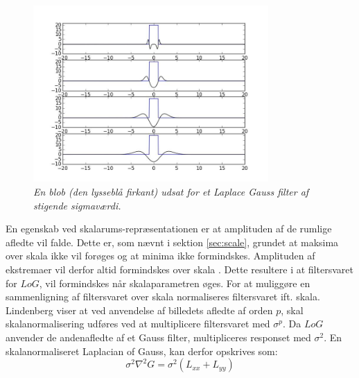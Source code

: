 \begin{figure}[H]
    \centering
    \includegraphics[width=0.80\textwidth]{fig/42.jpg}
    \vspace{-0.75em}
    \begin{center}
    \caption{{\footnotesize \textit{En blob (den lysseblå firkant) udsat for et Laplace Gauss filter af stigende sigmaværdi.
}}}
    \label{fig:laprespons}
     \end{center}
  \end{figure}
       \vspace{-2.7em}
\noindent
En egenskab ved skalarums-repræsentationen er at amplituden af de rumlige afledte vil falde. Dette er, som nævnt i sektion \ref{sec:scale}, grundet at maksima over skala ikke vil forøges og at minima ikke formindskes. Amplituden af ekstremaer vil derfor altid formindskes over skala \cite{phdlind}. Dette resultere i at filtersvaret for $LoG$, vil formindskes når skalaparametren øges. For at muliggøre en sammenligning af filtersvaret over skala normaliseres filtersvaret ift. skala.  Lindenberg \cite{lindenscale} viser at ved anvendelse af billedets afledte af orden $p$, skal skalanormalisering udføres ved at multiplicere filtersvaret med $\sigma^p$. Da $LoG$ anvender de andenafledte af et Gauss filter, multipliceres responset med $\sigma^2$. En skalanormaliseret Laplacian of Gauss, kan derfor opskrives som:
$$\sigma^2 \nabla^2G = \sigma^2(L_{xx}+L_{yy})$$
